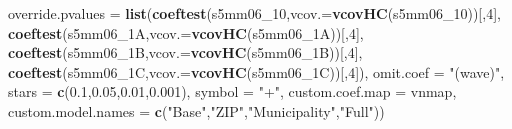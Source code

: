 \documentclass[
]{article}
\newenvironment{Shaded}{\begin{snugshade}}{\end{snugshade}}
\newcommand{\DataTypeTok}[1]{\textcolor[rgb]{0.13,0.29,0.53}{#1}}
\newcommand{\DecValTok}[1]{\textcolor[rgb]{0.00,0.00,0.81}{#1}}
\newcommand{\FloatTok}[1]{\textcolor[rgb]{0.00,0.00,0.81}{#1}}
\newcommand{\KeywordTok}[1]{\textcolor[rgb]{0.13,0.29,0.53}{\textbf{#1}}}
\newcommand{\NormalTok}[1]{#1}
\newcommand{\StringTok}[1]{\textcolor[rgb]{0.31,0.60,0.02}{#1}}
\begin{document}
\begin{Shaded}
\begin{Highlighting}[]
          \DataTypeTok{override.pvalues =} \KeywordTok{list}\NormalTok{(}\KeywordTok{coeftest}\NormalTok{(s5mm06_}\DecValTok{10}\NormalTok{,}\DataTypeTok{vcov.=}\KeywordTok{vcovHC}\NormalTok{(s5mm06_}\DecValTok{10}\NormalTok{))[,}\DecValTok{4}\NormalTok{],}
                                  \KeywordTok{coeftest}\NormalTok{(s5mm06_1A,}\DataTypeTok{vcov.=}\KeywordTok{vcovHC}\NormalTok{(s5mm06_1A))[,}\DecValTok{4}\NormalTok{],}
                                  \KeywordTok{coeftest}\NormalTok{(s5mm06_1B,}\DataTypeTok{vcov.=}\KeywordTok{vcovHC}\NormalTok{(s5mm06_1B))[,}\DecValTok{4}\NormalTok{],}
                                  \KeywordTok{coeftest}\NormalTok{(s5mm06_1C,}\DataTypeTok{vcov.=}\KeywordTok{vcovHC}\NormalTok{(s5mm06_1C))[,}\DecValTok{4}\NormalTok{]),}
          \DataTypeTok{omit.coef =} \StringTok{"(wave)"}\NormalTok{, }\DataTypeTok{stars =} \KeywordTok{c}\NormalTok{(}\FloatTok{0.1}\NormalTok{,}\FloatTok{0.05}\NormalTok{,}\FloatTok{0.01}\NormalTok{,}\FloatTok{0.001}\NormalTok{), }\DataTypeTok{symbol =} \StringTok{"+"}\NormalTok{,}
          \DataTypeTok{custom.coef.map =}\NormalTok{ vnmap, }
          \DataTypeTok{custom.model.names =} \KeywordTok{c}\NormalTok{(}\StringTok{"Base"}\NormalTok{,}\StringTok{"ZIP"}\NormalTok{,}\StringTok{"Municipality"}\NormalTok{,}\StringTok{"Full"}\NormalTok{))}
\end{Highlighting}
\end{Shaded}
\end{document}
